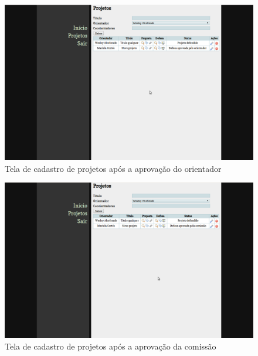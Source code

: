 \begin{figure}[htbp]
\centering
\includegraphics[width=1\textwidth]{fig/telas/processo/aluno_09_defesa_analisada_professor.png}
\caption{Tela de cadastro de projetos após a aprovação do orientador}
\label{fig:aluno_09_defesa_analisada_professor}
\end{figure}

\begin{figure}[htbp]
\centering
\includegraphics[width=1\textwidth]{fig/telas/processo/aluno_10_defesa_analisada_comissao.png}
\caption{Tela de cadastro de projetos após a aprovação da comissão}
\label{fig:aluno_10_defesa_analisada_comissao}
\end{figure}

